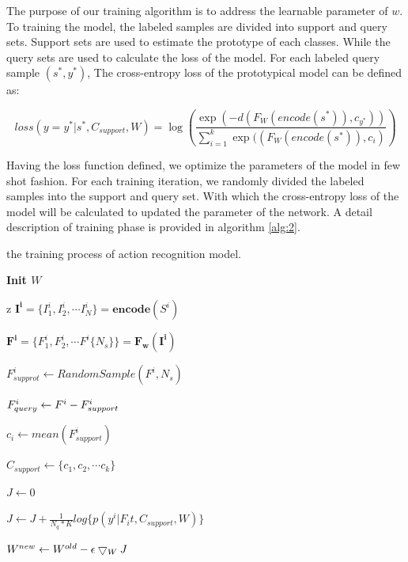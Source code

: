 \documentclass{bmvc2k}
\begin{document}
The purpose of our training algorithm is to address the learnable parameter of $w$. To training the model, the labeled samples are divided into support and query sets. Support sets are used to estimate the prototype of each classes. While the query sets are used to calculate the loss of the model. For each labeled query sample $(s^\ast,y^\ast)$, The cross-entropy loss of the prototypical model can be defined as:

$$loss(y=y^\ast | s^\ast,C_{support},W)=\log(\frac{\exp (-d(F_W(encode(s^\ast)),c_{y^\ast}))}{\sum_{i=1}^{k}\exp((F_W(encode(s^\ast)),c_i)})$$

Having the loss function defined, we optimize the parameters of the model in few shot fashion. For each training iteration, we randomly divided the labeled samples into the support and query set. With which the cross-entropy loss of the model will be calculated to updated the parameter of the network. A detail description of training phase is provided in algorithm \ref{alg:2}.


\begin{algorithm}[htb]
	\caption{the training process of action recognition model.}
	\label{alg:2}
	\bf{Init $W$}

	
	\Repeat{}
	{
		{z
			$\mathbf{I^i}=\{I^i_1,I^i_2,\cdots I^i_N\}=\mathbf{encode}(S^i)$
			
			$\mathbf{F^i}=\{F^i_1,F^i_2,\cdots F^i \{ N_s \} \}=\mathbf{F_w(I^i)}$
		}	
		{
			$F^i_{supprot}\leftarrow RandomSample(F^i,N_s)$
			
			$F^i_{query}\leftarrow F^i\-- F^i_{support}$
			
			$c_i\leftarrow mean(F^i_{support})$
		}
		$C_{support}\leftarrow \{c_1,c_2,\cdots c_k\}$
		
		$J\leftarrow0$
		
		{
			{
				
				$J\leftarrow J+ \frac{1}{N_q*K}log\{p(y^i|F_it,C_{support},W)\}$
			}	
		}
		$W^{new}\leftarrow W^{old}\-- \epsilon\bigtriangledown_W J$
	}
\end{algorithm}
\end{document}
